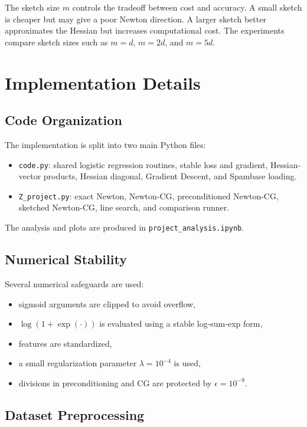\documentclass[12pt,a4paper]{report}
\begin{document}
The sketch size \(m\) controls the tradeoff between cost and accuracy. A small sketch is cheaper but may give a poor Newton direction. A larger sketch better approximates the Hessian but increases computational cost. The experiments compare sketch sizes such as \(m=d\), \(m=2d\), and \(m=5d\).

\chapter{Implementation Details}

\section{Code Organization}

The implementation is split into two main Python files:

\begin{itemize}
    \item \texttt{code.py}: shared logistic regression routines, stable loss and gradient, Hessian-vector products, Hessian diagonal, Gradient Descent, and Spambase loading.
    \item \texttt{Z\_project.py}: exact Newton, Newton-CG, preconditioned Newton-CG, sketched Newton-CG, line search, and comparison runner.
\end{itemize}

The analysis and plots are produced in \texttt{project\_analysis.ipynb}.

\section{Numerical Stability}

Several numerical safeguards are used:

\begin{itemize}
    \item sigmoid arguments are clipped to avoid overflow,
    \item \(\log(1+\exp(\cdot))\) is evaluated using a stable log-sum-exp form,
    \item features are standardized,
    \item a small regularization parameter \(\lambda=10^{-4}\) is used,
    \item divisions in preconditioning and CG are protected by \(\epsilon=10^{-9}\).
\end{itemize}

\section{Dataset Preprocessing}
\end{document}
